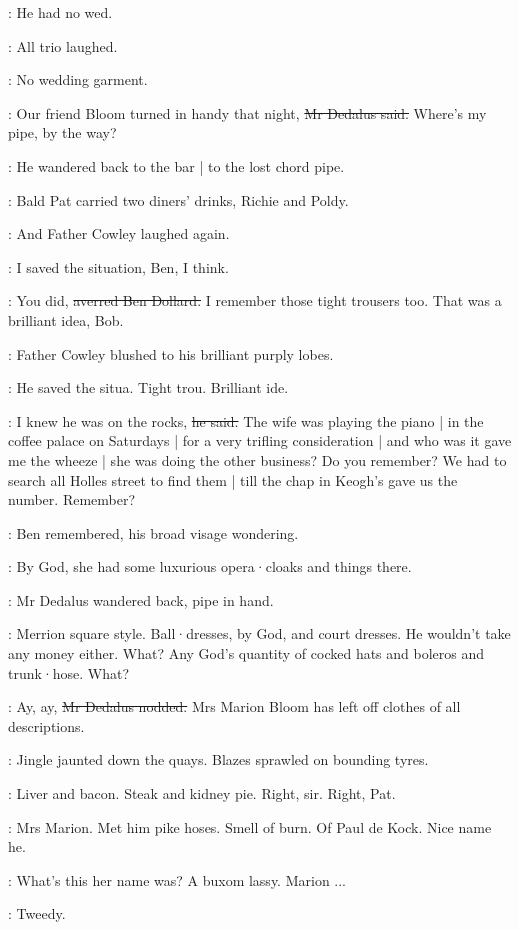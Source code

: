 \simon:
He had no wed.

:
All trio laughed.

\dollard:
No wedding garment.

\simon:
Our friend Bloom turned in handy that night,
\sout{Mr Dedalus said.}
Where's my pipe,
by the way?

:
He wandered back to the bar |
to the lost chord pipe.

:
Bald Pat carried
two diners' drinks,
Richie and Poldy.

:
And Father Cowley laughed again.

\cowley:
I saved the situation,
Ben,
I think.

\dollard:
You did,
\sout{averred Ben Dollard.}
I remember those tight trousers too.
That was a brilliant idea,
Bob.

:
Father Cowley blushed to his brilliant purply lobes.

:
He saved the situa.
Tight trou.
Brilliant ide.

\cowley:
I knew he was on the rocks,
\sout{he said.}
The wife was playing the piano |
in the coffee palace on Saturdays |
for a very trifling consideration |
and who was it gave me the wheeze |
she was doing the other business?
Do you remember?
We had to search all Holles street to find them |
till the chap in Keogh's gave us the number.
Remember?

:
Ben remembered,
his broad visage wondering.

\dollard:
By God,
she had some luxurious opera·cloaks
and things there.

:
Mr Dedalus wandered back,
pipe in hand.

\dollard:
Merrion square style.
Ball·dresses,
by God,
and court dresses.
He wouldn't take any money either.
What?
Any God's quantity of cocked hats
and boleros
and trunk·hose.
What?

\simon:
Ay, ay,
\sout{Mr Dedalus nodded.}
Mrs Marion Bloom has left off clothes
of all descriptions.

:
Jingle jaunted down the quays.
Blazes sprawled on bounding tyres.

:
Liver and bacon.
Steak and kidney pie.
Right, sir.
Right, Pat.

\BloomIntB:
Mrs Marion.
Met him pike hoses.
Smell of burn.
Of Paul de Kock.
Nice name he.

\dollard:
What's this her name was?
A buxom lassy.
Marion ...

\simon:
Tweedy.

